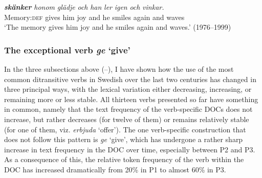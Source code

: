 \documentclass[output=paper]{langscibook}
\begin{document}
\ex {} \textbf{\textit{skänker}} \textit{honom} \textit{glädje} \textit{och} \textit{han} \textit{ler} \textit{igen} \textit{och} \textit{vinkar.} \\
        Memory:\textsc{def} gives     him   joy     and he     smiles   again   and   waves\\
\glt ‘The memory gives him joy and he smiles again and waves.’ (1976–1999)
\z
\z


\subsubsection{The exceptional verb \textit{ge} ‘give’}\label{sec:valdeson:5.3.4}

\begin{sloppypar}
In the three subsections above (–), I have shown how the use of the most common ditransitive verbs in Swedish over the last two centuries has changed in three principal ways, with the lexical variation either decreasing, increasing, or remaining more or less stable. All thirteen verbs presented so far have something in common, namely that the text frequency of the verb-specific DOCs does not increase, but rather decreases (for twelve of them) or remains relatively stable (for one of them, viz. \textit{erbjuda} ‘offer’). The one verb-specific construction that does not follow this pattern is \textit{ge} ‘give’, which has undergone a rather sharp increase in text frequency in the DOC over time, especially between P2 and P3. As a consequence of this, the relative token frequency of the verb within the DOC has increased dramatically from 20\% in P1 to almost 60\% in P3.
\end{sloppypar}

\begin{table}
\caption{\label{tab:valdeson:21}; Frequency measures of the verb-specific DOC with \textit{ge} ‘give’}
\end{table}
\end{document}
